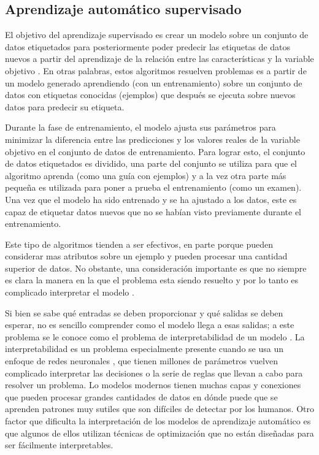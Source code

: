 \subsection{Aprendizaje automático supervisado}

El objetivo del aprendizaje supervisado es crear un modelo sobre un conjunto de datos etiquetados para posteriormente poder predecir las etiquetas de datos nuevos a partir del aprendizaje de la relación entre las características y la variable objetivo \cite{rebala_introduction_2019}. En otras palabras, estos algoritmos resuelven problemas es a partir de un modelo generado aprendiendo (con un entrenamiento) sobre un conjunto de datos con etiquetas conocidas (ejemplos) que después se ejecuta sobre nuevos datos para predecir su etiqueta. 

Durante la fase de entrenamiento, el modelo ajusta sus parámetros para minimizar la diferencia entre las predicciones y los valores reales de la variable objetivo en el conjunto de datos de entrenamiento. Para lograr esto, el conjunto de datos etiquetados es dividido, una parte del conjunto se utiliza para que el algoritmo aprenda (como una guía con ejemplos) y a la vez otra parte más pequeña es utilizada para poner a prueba el entrenamiento (como un examen). Una vez que el modelo ha sido entrenado y se ha ajustado a los datos, este es capaz de etiquetar datos nuevos que no se habían visto previamente durante el entrenamiento. 

Este tipo de algoritmos tienden a ser efectivos, en parte porque pueden considerar mas atributos sobre un ejemplo y pueden procesar una cantidad superior de datos. No obstante, una consideración importante es que no siempre es clara la manera en la que el problema esta siendo resuelto y por lo tanto es complicado interpretar el modelo \cite{rebala_introduction_2019}. 

Si bien se sabe qué entradas se deben proporcionar y qué salidas se deben esperar, no es sencillo comprender como el modelo llega a esas salidas; a este problema se le conoce como el problema de interpretabilidad de un modelo \cite{zhang_survey_2021, rebala_introduction_2019}. La interpretabilidad es un problema especialmente presente cuando se usa un enfoque de redes neuronales \cite{zhang_survey_2021}, que tienen millones de parámetros vuelven complicado interpretar las decisiones o la serie de reglas que llevan a cabo para resolver un problema. Lo modelos modernos tienen muchas capas y conexiones que pueden procesar grandes cantidades de datos en dónde puede que se aprenden patrones muy sutiles que son difíciles de detectar por los humanos. Otro factor que dificulta la interpretación de los modelos de aprendizaje automático es que algunos de ellos utilizan técnicas de optimización que no están diseñadas para ser fácilmente interpretables.

